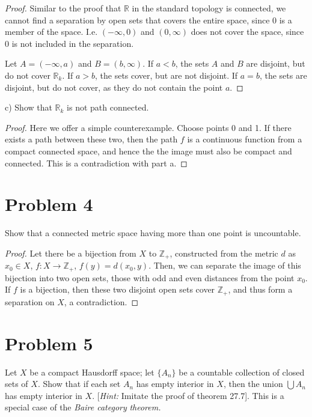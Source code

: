 \documentclass[11pt]{article}
\begin{document}
\begin{proof}
Similar to the proof that \(\mathbb{R}\) in the standard topology is connected, we
cannot find a separation by open sets that covers the entire space, since 0 is a
member of the space. I.e. \((-\infty, 0)\) and \((0, \infty)\) does not cover the
space, since 0 is not included in the separation. 

Let \(A = (-\infty, a)\) and \(B = (b, \infty)\). If \(a < b\), the sets \(A\) and \(B\)
are disjoint, but do not cover \(\mathbb{R}_k\). If \(a > b\), the sets cover, but
are not disjoint. If \(a = b\), the sets are disjoint, but do not cover, as they
do not contain the point \(a\). 
\end{proof}

c) Show that \(\mathbb{R}_k\) is not path connected. 

\begin{proof}
Here we offer a simple counterexample. Choose points 0 and 1. If there exists a
path between these two, then the path \(f\) is a continuous function from a
compact connected space, and hence the the image must also be compact and
connected. This is a contradiction with part a. 
\end{proof}
\section{Problem 4}
\label{sec:org7e1f2c6}
Show that a connected metric space having more than one point is uncountable. 

\begin{proof}
Let there be a bijection from \(X\) to \(\mathbb{Z}_+\), constructed from the metric
\(d\) as \(x_0 \in X\), \(f:X\rightarrow\mathbb{Z}_+\), \(f(y) = d(x_0, y)\). Then, we
can separate the image of this bijection into two open sets, those with odd and
even distances from the point \(x_0\). If \(f\) is a bijection, then these two
disjoint open sets cover \(\mathbb{Z}_+\), and thus form a separation on \(X\), a
contradiction. 
\end{proof}
\section{Problem 5}
\label{sec:org9f21811}
Let \(X\) be a compact Hausdorff space; let \(\{A_n\}\) be a countable collection of
closed sets of \(X\). Show that if each set \(A_n\) has empty interior in \(X\), then
the union \(\bigcup A_n\) has empty interior in \(X\). [\textit{Hint:} Imitate the
proof of theorem 27.7]. This is a special case of the \textit{Baire category}
\textit{theorem.}
\end{document}
